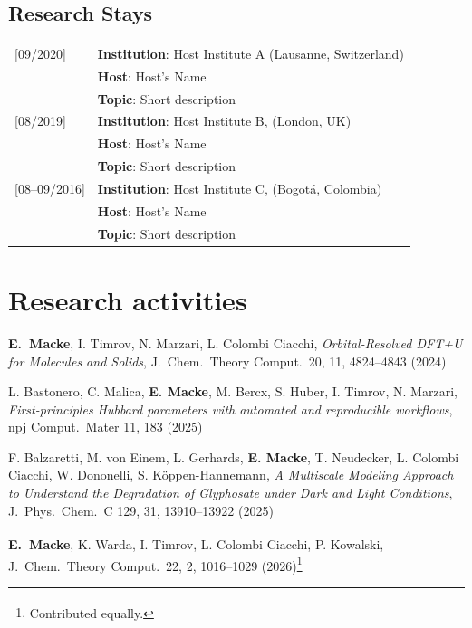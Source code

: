     \section*{Research Stays}
        \begin{tabular}{lp{10cm}}
        [09/2020]           & \textbf{Institution}: Host Institute A (Lausanne, Switzerland) \\
                            & \textbf{Host}: Host's Name  \\
                            & \textbf{Topic}: Short description \\ \hline
                            
        [08/2019]    & \textbf{Institution}: Host Institute B, (London, UK) \\
                            & \textbf{Host}: Host's Name \\
                            & \textbf{Topic}:  Short description \\ \hline
        
        [08--09/2016]       & \textbf{Institution}: Host Institute C, (Bogotá, Colombia) \\
                            & \textbf{Host}: Host's Name \\
                            & \textbf{Topic}: Short description \\ 
        \end{tabular}

\chapter{Research activities}

\begin{etaremune}
    \item[\cite{mackeOrbitalResolved2024}] \textbf{E.~Macke}, I. Timrov, N. Marzari, L. Colombi Ciacchi, \textit{Orbital-Resolved DFT+U for Molecules and Solids}, J.~Chem.~Theory Comput.~20, 11, 4824–4843 (2024)
    \item [\cite{bastoneroFirstprinciples2025}] L. Bastonero, C. Malica, \textbf{E. Macke}, M. Bercx, S. Huber, I. Timrov, N. Marzari, \textit{First-principles Hubbard parameters with automated and reproducible workflows}, npj Comput.~Mater 11, 183 (2025)
    \item [\cite{balzarettiMultiscale2025}] F. Balzaretti, M. von Einem, L. Gerhards, \textbf{E. Macke}, T. Neudecker, L. Colombi Ciacchi, W. Dononelli, S. Köppen-Hannemann, \textit{A Multiscale Modeling Approach to Understand the Degradation of Glyphosate under Dark and Light Conditions}, J.~Phys.~Chem.~C 129, 31, 13910–13922 (2025)
    \item[\cite{wardaGetting2025}] \textbf{E.~Macke\textsuperscript{\textdagger}}, K. Warda\textsuperscript{\textdagger}, I. Timrov, L. Colombi Ciacchi, P. Kowalski, J.~Chem.~Theory Comput.~22, 2, 1016–1029 (2026)\footnote{\textsuperscript{\textdagger} Contributed equally.}
\end{etaremune}

